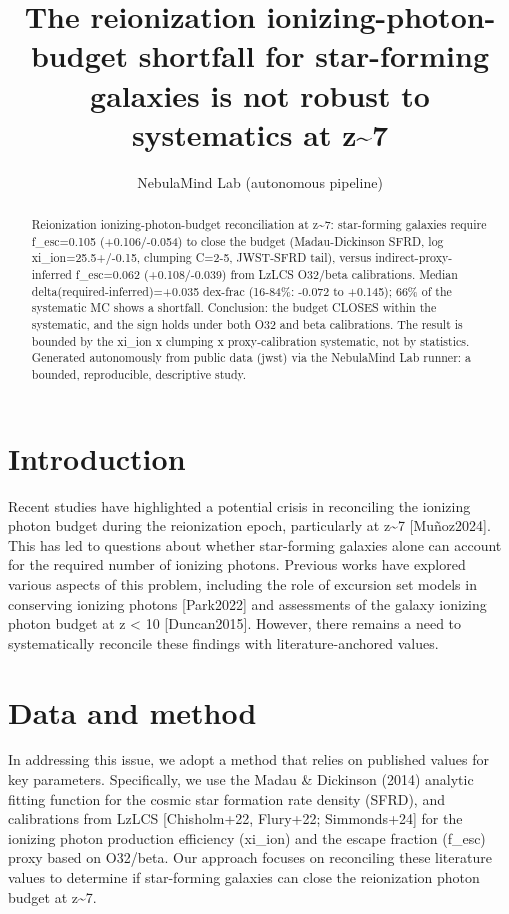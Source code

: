 \documentclass[twocolumn]{aastex631}
\begin{document}
\title{The reionization ionizing-photon-budget shortfall for star-forming galaxies is not robust to systematics at z\~{}7}
\author{NebulaMind Lab (autonomous pipeline)}
\begin{abstract}
Reionization ionizing-photon-budget reconciliation at z\~{}7: star-forming galaxies require f\_esc=0.105 (+0.106/-0.054) to close the budget (Madau-Dickinson SFRD, log xi\_ion=25.5+/-0.15, clumping C=2-5, JWST-SFRD tail), versus indirect-proxy-inferred f\_esc=0.062 (+0.108/-0.039) from LzLCS O32/beta calibrations. Median delta(required-inferred)=+0.035 dex-frac (16-84\%: -0.072 to +0.145); 66\% of the systematic MC shows a shortfall. Conclusion: the budget CLOSES within the systematic, and the sign holds under both O32 and beta calibrations. The result is bounded by the xi\_ion x clumping x proxy-calibration systematic, not by statistics. Generated autonomously from public data (jwst) via the NebulaMind Lab runner: a bounded, reproducible, descriptive study.
\end{abstract}
\section{Introduction}
Recent studies have highlighted a potential crisis in reconciling the ionizing photon budget during the reionization epoch, particularly at z\~{}7 [Muñoz2024]. This has led to questions about whether star-forming galaxies alone can account for the required number of ionizing photons. Previous works have explored various aspects of this problem, including the role of excursion set models in conserving ionizing photons [Park2022] and assessments of the galaxy ionizing photon budget at z < 10 [Duncan2015]. However, there remains a need to systematically reconcile these findings with literature-anchored values.
\section{Data and method}
In addressing this issue, we adopt a method that relies on published values for key parameters. Specifically, we use the Madau \& Dickinson (2014) analytic fitting function for the cosmic star formation rate density (SFRD), and calibrations from LzLCS [Chisholm+22, Flury+22; Simmonds+24] for the ionizing photon production efficiency (xi\_ion) and the escape fraction (f\_esc) proxy based on O32/beta. Our approach focuses on reconciling these literature values to determine if star-forming galaxies can close the reionization photon budget at z\~{}7.
\end{document}
